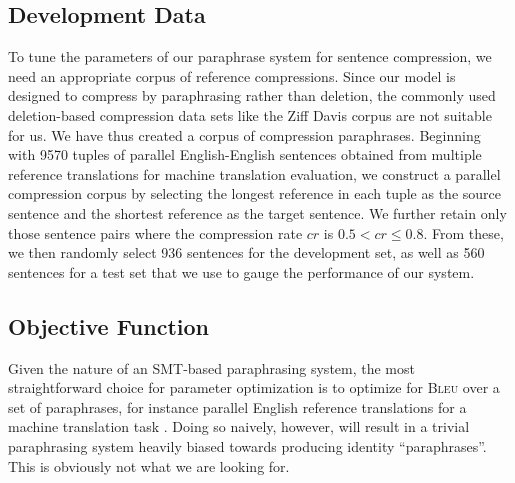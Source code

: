 \documentclass[11pt]{article}
\begin{document}
\subsection{Development Data}
\label{dev-data}
To tune the parameters of our paraphrase system for sentence
compression, we need an appropriate corpus of reference
compressions. Since our model is designed to compress by paraphrasing
rather than deletion, the commonly used deletion-based compression
data sets like the Ziff Davis corpus are not suitable for us. We have
thus created a corpus of compression paraphrases. Beginning with 9570
tuples of parallel English-English sentences obtained from multiple
reference translations for machine translation evaluation, we
construct a parallel compression corpus by selecting the longest
reference in each tuple as the source sentence and the shortest
reference as the target sentence. We further retain only those
sentence pairs where the compression rate $\mathit{cr}$ is $0.5 <
\mathit{cr} \leq 0.8$. From these, we then randomly select 936
sentences for the development set, as well as 560 sentences for a test
set that we use to gauge the performance of our system.


\subsection{Objective Function}
\label{objective-fn}

Given the nature of an SMT-based paraphrasing system, the most
straightforward choice for parameter optimization is to optimize for
\textsc{Bleu} over a set of paraphrases, for instance parallel English
reference translations for a machine translation task
\cite{Madnani2007}. Doing so naively, however, will result in a
trivial paraphrasing system heavily biased towards producing identity
``paraphrases''. This is obviously not what we are looking for.

\end{document}
